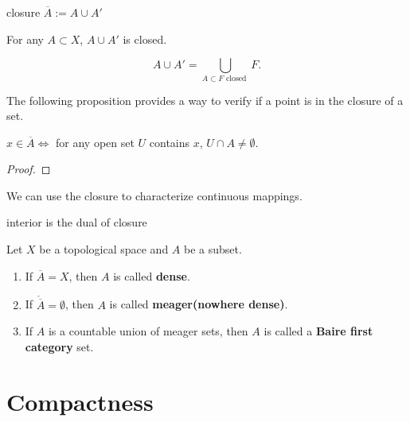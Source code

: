 closure $\overline{A}:=A\cup A'$



\begin{theorem}
    For any $A\subset X$, $A\cup A'$ is closed.
\end{theorem}
\begin{corollary}
    \begin{equation*}
        A\cup A'=\bigcup_{A\subset F \text{ closed }}F.
    \end{equation*}
\end{corollary}

The following proposition provides a way to verify if a point is in the closure of a set.
\begin{proposition}\label{prop:x in overline A}
    $x\in \overline{A}\Longleftrightarrow$ for any open set $U$ contains $x$, $U\cap A\neq\emptyset$.
\end{proposition}
\begin{proof}
    
\end{proof}

We can use the closure to characterize continuous mappings.
\begin{proposition}
    
\end{proposition}

interior is the dual of closure 

\begin{definition}
    Let $X$ be a topological space and $A$ be a subset.
    \begin{enumerate}[label=(\roman*)]
        \item If $\overline{A}=X$, then $A$ is called \textbf{dense}.
        \item If $\mathring{\overline{A}}=\emptyset$, then $A$ is called \textbf{meager(nowhere dense)}.
        \item If $A$ is a countable union of meager sets, then $A$ is called a \textbf{Baire first category} set.
    \end{enumerate}
\end{definition}

\begin{definition}
    
\end{definition}


\section{Compactness}



